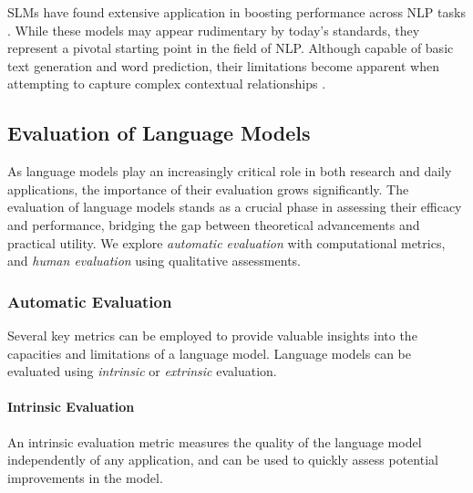 
\acp{SLM} have found extensive application in boosting performance across \ac{NLP} tasks \citep{bahl1989tree, thede1999second}. While these models may appear rudimentary by today's standards, they represent a pivotal starting point in the field of \ac{NLP}. Although capable of basic text generation and word prediction, their limitations become apparent when attempting to capture complex contextual relationships \citep{rosenfeld2000two, arisoy2012deep}.


\subsection{Evaluation of Language Models}

As language models play an increasingly critical role in both research and daily applications, the importance of their evaluation grows significantly. The evaluation of language models stands as a crucial phase in assessing their efficacy and performance, bridging the gap between theoretical advancements and practical utility. We explore \textit{automatic evaluation} with computational metrics, and \textit{human evaluation} using qualitative assessments. 

\subsubsection{Automatic Evaluation} 

Several key metrics can be employed to provide valuable insights into the capacities and limitations of a language model. Language models can be evaluated using \textit{intrinsic} or \textit{extrinsic} evaluation. 

\paragraph{Intrinsic Evaluation} An intrinsic evaluation metric measures the quality of the language model independently of any application, and can be used to quickly assess potential improvements in the model.

